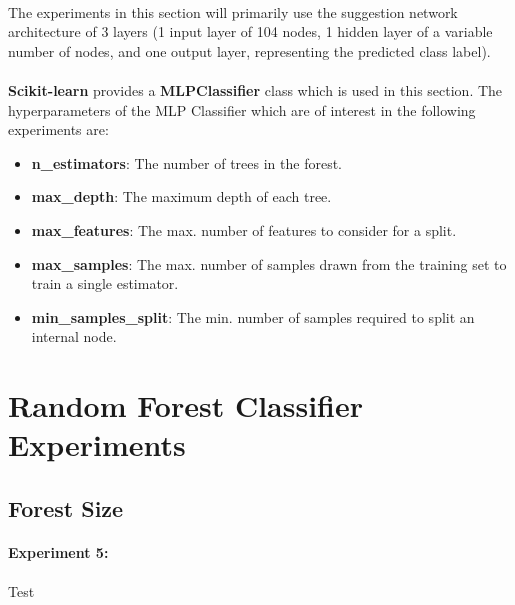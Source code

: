 \documentclass[12pt, letterpaper]{article}
\begin{document}
\paragraph*{}The experiments in this section will primarily use the suggestion network
architecture of 3 layers (1 input layer of 104 nodes, 1 hidden layer of a variable number 
of nodes, and one output layer, representing the predicted class label).

\paragraph*{}\textbf{Scikit-learn} provides a \textbf{MLPClassifier} class
which is used in this section. The hyperparameters of the MLP Classifier
which are of interest in the following experiments are:

\begin{itemize}
    \item \textbf{n\_estimators}: The number of trees in the forest.
    \item \textbf{max\_depth}: The maximum depth of each tree.
    \item \textbf{max\_features}: The max. number of features to consider for a split.
    \item \textbf{max\_samples}: The max. number of samples drawn from the training set to train a single estimator.
    \item \textbf{min\_samples\_split}: The min. number of samples required to split an internal node.
\end{itemize}

\section{Random Forest Classifier Experiments}

\subsection{Forest Size}

\paragraph*{Experiment 5:}

\paragraph*{}Test
\end{document}

